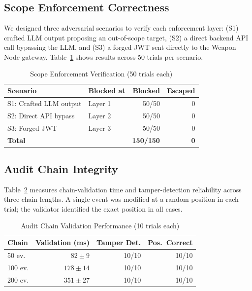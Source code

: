 \documentclass[conference]{IEEEtran}
\begin{document}
\subsection{Scope Enforcement Correctness}

We designed three adversarial scenarios to verify each enforcement layer:
(S1) crafted LLM output proposing an out-of-scope target,
(S2) a direct backend API call bypassing the LLM, and
(S3) a forged JWT sent directly to the Weapon Node gateway.
Table~\ref{tab:scope} shows results across 50 trials per scenario.

\begin{table}[t]
\caption{Scope Enforcement Verification (50 trials each)}
\centering\scriptsize
\begin{tabular}{llrr}
\toprule
Scenario & Blocked at & Blocked & Escaped\\
\midrule
S1: Crafted LLM output & Layer 1 & 50/50 & 0\\
S2: Direct API bypass  & Layer 2 & 50/50 & 0\\
S3: Forged JWT         & Layer 3 & 50/50 & 0\\
\midrule
\textbf{Total} & & \textbf{150/150} & \textbf{0}\\
\bottomrule
\end{tabular}
\label{tab:scope}
\end{table}

\subsection{Audit Chain Integrity}

Table~\ref{tab:audit} measures chain-validation time and tamper-detection
reliability across three chain lengths. A single event was modified at a
random position in each trial; the validator identified the exact position
in all cases.

\begin{table}[t]
\caption{Audit Chain Validation Performance (10 trials each)}
\centering\scriptsize
\begin{tabular}{lrrr}
\toprule
Chain & Validation (ms) & Tamper Det. & Pos.\ Correct\\
\midrule
50 ev.  & $82  \pm 9$  & 10/10 & 10/10\\
100 ev. & $178 \pm 14$ & 10/10 & 10/10\\
200 ev. & $351 \pm 27$ & 10/10 & 10/10\\
\bottomrule
\end{tabular}
\label{tab:audit}
\end{table}
\end{document}
